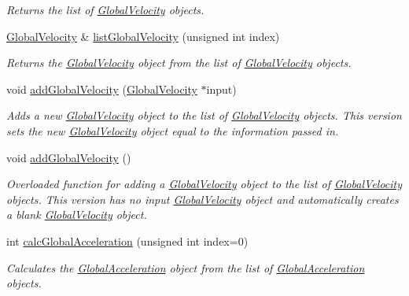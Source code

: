 \begin{DoxyCompactItemize}
\begin{DoxyCompactList}\small\item\em Returns the list of \hyperlink{classosea_1_1ofreq_1_1_global_velocity}{Global\-Velocity} objects. \end{DoxyCompactList}\item 
\hyperlink{classosea_1_1ofreq_1_1_global_velocity}{Global\-Velocity} \& \hyperlink{classosea_1_1ofreq_1_1_outputs_body_aff6a59ad46b75242919810b72e221dd9}{list\-Global\-Velocity} (unsigned int index)
\begin{DoxyCompactList}\small\item\em Returns the \hyperlink{classosea_1_1ofreq_1_1_global_velocity}{Global\-Velocity} object from the list of \hyperlink{classosea_1_1ofreq_1_1_global_velocity}{Global\-Velocity} objects. \end{DoxyCompactList}\item 
void \hyperlink{classosea_1_1ofreq_1_1_outputs_body_aa334cb10ee07542372cdcef0a7ecf750}{add\-Global\-Velocity} (\hyperlink{classosea_1_1ofreq_1_1_global_velocity}{Global\-Velocity} $\ast$input)
\begin{DoxyCompactList}\small\item\em Adds a new \hyperlink{classosea_1_1ofreq_1_1_global_velocity}{Global\-Velocity} object to the list of \hyperlink{classosea_1_1ofreq_1_1_global_velocity}{Global\-Velocity} objects. This version sets the new \hyperlink{classosea_1_1ofreq_1_1_global_velocity}{Global\-Velocity} object equal to the information passed in. \end{DoxyCompactList}\item 
void \hyperlink{classosea_1_1ofreq_1_1_outputs_body_a07a548f3df9fa5aff4223a60f5f1b56c}{add\-Global\-Velocity} ()
\begin{DoxyCompactList}\small\item\em Overloaded function for adding a \hyperlink{classosea_1_1ofreq_1_1_global_velocity}{Global\-Velocity} object to the list of \hyperlink{classosea_1_1ofreq_1_1_global_velocity}{Global\-Velocity} objects. This version has no input \hyperlink{classosea_1_1ofreq_1_1_global_velocity}{Global\-Velocity} object and automatically creates a blank \hyperlink{classosea_1_1ofreq_1_1_global_velocity}{Global\-Velocity} object. \end{DoxyCompactList}\item 
int \hyperlink{classosea_1_1ofreq_1_1_outputs_body_a4be242a9a54fef3ba42674f815c7ae61}{calc\-Global\-Acceleration} (unsigned int index=0)
\begin{DoxyCompactList}\small\item\em Calculates the \hyperlink{classosea_1_1ofreq_1_1_global_acceleration}{Global\-Acceleration} object from the list of \hyperlink{classosea_1_1ofreq_1_1_global_acceleration}{Global\-Acceleration} objects. \end{DoxyCompactList}\item 

\end{DoxyCompactItemize}
